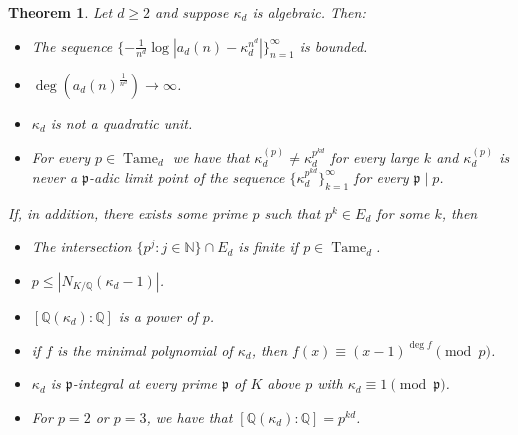 \documentclass{article}
\theoremstyle{plain}
\newtheorem{theorem}{Theorem}[section]
\theoremstyle{definition}
\theoremstyle{remark}
\newcommand{\Q}{\mathbb{Q}}
\DeclareMathOperator{\Tame}{Tame}
\begin{document}
\begin{theorem}
Let $d\ge2$ and suppose $\kappa_d$ is algebraic. Then: 

\begin{itemize}
    \item The sequence $\{-\frac{1}{n^d} \log |a_d(n)-\kappa_d^{n^d}|\}_{n=1}^\infty$ is bounded.
    \item $\deg(a_d(n)^{\frac{1}{n^d}}) \to \infty$. 
    \item $\kappa_d$ is not a quadratic unit. 
    \item For every $p \in \Tame_d$ we have that $\kappa_d^{(p)}\ne\kappa_d^{p^{kd}}$ for every large $k$ and $\kappa_d^{(p)}$ is never a $\mathfrak p$-adic limit point of the sequence $\big\{\kappa_d^{p^{kd}}\big\}_{k=1}^\infty$ for every $\mathfrak{p} \mid p$.
\end{itemize}

If, in addition, there exists some prime $p$ such that $p^k\in E_d$ for some $k$, then
\begin{itemize}
\item The intersection $\{p^j \colon j \in\mathbb{N}\} \cap E_d$ is finite if $p \in \Tame_d$. 
\item $p\le|N_{K/\Q}(\kappa_d-1)|$.
\item $[\Q(\kappa_d):\Q]$ is a power of $p$.
\item if $f$ is the minimal polynomial of $\kappa_d$, then $f(x)\equiv(x-1)^{\deg f}\pmod p$.
\item $\kappa_d$ is $\mathfrak p$-integral at every prime $\mathfrak p$ of $K$ above $p$ with $\kappa_d\equiv1\pmod{\mathfrak p}$. 
\item For $p=2$ or $p=3$, we have that $[\Q(\kappa_d):\Q]=p^{kd}$. 
\end{itemize}
\end{theorem}



\end{document}
